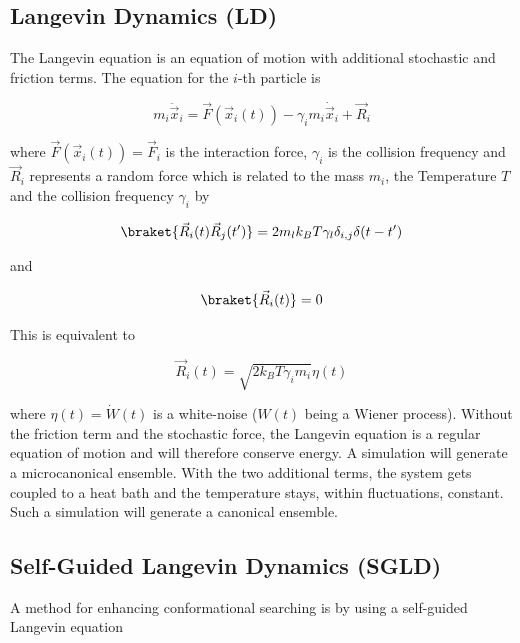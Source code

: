 \documentclass[a4paper]{article}
\begin{document}
\subsection{Langevin Dynamics (LD)}

The Langevin equation is an equation of motion with additional stochastic and friction terms. The equation for the $i$-th particle is

\begin{equation}
m_i \ddot{\vec{x}}_i = \vec{F}(\vec{x}_i(t)) - \gamma_i m_i \dot{\vec{x}}_i + \vec{R}_i
\label{eq:langevin_equation}
\end{equation}

where $\vec{F}(\vec{x}_i(t)) = \vec{F}_i$ is the interaction force, $\gamma_i$ is the collision frequency and $\vec{R}_i$ represents a random force which is related to the mass $m_i$, the Temperature $T$ and the collision frequency $\gamma_i$ by

\begin{equation}
\braket{\vec{R}_i (t) \vec{R}_j (t')} = 2 m_l k_B T \gamma_l \delta_{i,j} \delta (t-t')
\label{eq:random_force_1}
\end{equation}

and

\begin{equation}
\braket{\vec{R}_i (t)} = 0
\label{eq:random_force_2}
\end{equation}

This is equivalent to

\begin{equation}
\vec{R}_i(t) = \sqrt{2 k_B T \gamma_i m_i} \eta(t)
\label{eq:random_force_3}
\end{equation}

where $\eta(t) = \dot{W	}(t)$ is a white-noise ($W(t)$ being a Wiener process). Without the friction term and the stochastic force, the Langevin equation is a regular equation of motion and will therefore conserve energy. A simulation will generate a microcanonical ensemble. With the two additional terms, the system gets coupled to a heat bath and the temperature stays, within fluctuations, constant. Such a simulation will generate a canonical ensemble.

\subsection{Self-Guided Langevin Dynamics (SGLD)}

A method for enhancing conformational searching is by using a self-guided Langevin equation~\cite{XiongwuWu2011a}
\end{document}
